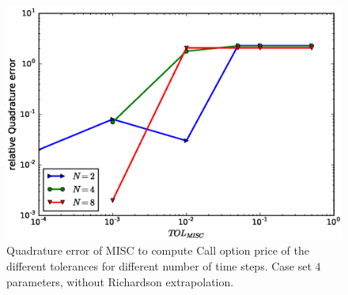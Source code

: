 \documentclass[11pt]{article}
\begin{document}
\begin{figure}[h!]
	\centering
	\includegraphics[width=0.7\linewidth]{./figures/rBergomi_MISC_quadratre_error/vs_TOL/set4/relative_quad_error_wrt_MISC_TOL_set4_non_rich}
	
	
	\caption{Quadrature error of MISC to compute Call option price of the different tolerances for different number of time steps. Case  set $4$ parameters, without Richardson extrapolation.}
	\label{fig:Quadrature_error_set4}
\end{figure}
\end{document}
